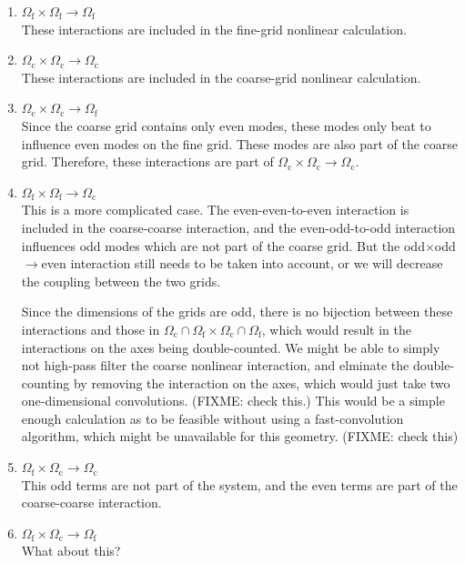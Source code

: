 \documentclass[10pt,showpacs,showkeys,%
amsfonts,amsmath,onecolumn,
floatfix,aps,superscriptaddress]{revtex4}
\begin{document}
\begin{enumerate}
  \item 
    $\Omega_{\text{f}} \times \Omega_{\text{f}}\rightarrow \Omega_{\text{f}}$\\
    These interactions are included in the fine-grid nonlinear calculation.
  \item 
    $\Omega_{\text{c}} \times \Omega_{\text{c}}\rightarrow \Omega_{\text{c}}$\\
    These interactions are included in the coarse-grid nonlinear calculation.
  \item 
    $\Omega_{\text{c}} \times \Omega_{\text{c}}\rightarrow \Omega_{\text{f}}$\\
    Since the coarse grid contains only even modes, these modes only beat
    to influence even modes on the fine grid.  These modes are also part
    of the coarse grid.  Therefore, these interactions are part of
    $\Omega_{\text{c}} \times \Omega_{\text{c}}\rightarrow \Omega_{\text{c}}$.
  \item
    $\Omega_{\text{f}} \times \Omega_{\text{f}}\rightarrow \Omega_{\text{c}}$\\
    This is a more complicated case. The even-even-to-even interaction
    is included in the coarse-coarse interaction, and the even-odd-to-odd
    interaction influences odd modes which are not part of the coarse grid.
    But the odd$\times$odd$\rightarrow$even interaction still needs to
    be taken into account, or we will decrease the coupling between the
    two grids.
    
    Since the dimensions of the grids are odd, there is no bijection
    between these interactions and those in 
    $\Omega_{\text{c}}\cap \Omega_{\text{f}} \times 
    \Omega_{\text{c}}\cap \Omega_{\text{f}}$, which would result in the 
    interactions on the axes being double-counted. We might be able to
    simply not high-pass filter the coarse nonlinear interaction, and 
    elminate the double-counting by removing the interaction on the 
    axes, which would just take two one-dimensional convolutions. 
    (FIXME: check this.) This would be a simple enough calculation
    as to be feasible without using a fast-convolution algorithm, which
    might be unavailable for this geometry. (FIXME: check this)
    
  \item
    $\Omega_{\text{f}} \times \Omega_{\text{c}}\rightarrow \Omega_{\text{c}}$\\
    This odd terms are not part of the system, and the even terms are
    part of the coarse-coarse interaction.
  \item
    $\Omega_{\text{f}} \times \Omega_{\text{c}}\rightarrow \Omega_{\text{f}}$\\
    What about this?
\end{enumerate}
\end{document}
